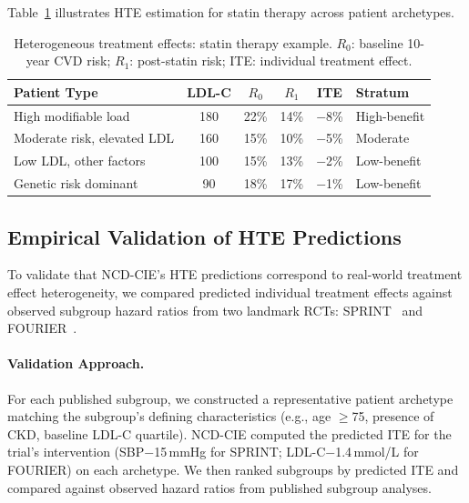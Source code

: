 \documentclass[runningheads]{llncs}
\begin{document}
Table~\ref{tab:hte} illustrates HTE estimation for statin therapy
across patient archetypes.

\renewcommand{\arraystretch}{1.1}
\begin{table}[t]
\centering
\caption{Heterogeneous treatment effects: statin therapy example.
$R_0$: baseline 10-year CVD risk; $R_1$: post-statin risk;
ITE: individual treatment effect.}\label{tab:hte}
\small
\begin{tabular}{@{}lccccl@{}}
\toprule
\textbf{Patient Type} & \textbf{LDL-C} & \textbf{$R_0$} & \textbf{$R_1$} &
\textbf{ITE} & \textbf{Stratum} \\
\midrule
High modifiable load & 180 & 22\% & 14\% & $-$8\% & High-benefit \\
Moderate risk, elevated LDL & 160 & 15\% & 10\% & $-$5\% & Moderate \\
Low LDL, other factors & 100 & 15\% & 13\% & $-$2\% & Low-benefit \\
Genetic risk dominant & 90 & 18\% & 17\% & $-$1\% & Low-benefit \\
\bottomrule
\end{tabular}
\end{table}
\renewcommand{\arraystretch}{1.0}

\subsection{Empirical Validation of HTE Predictions}\label{sec:htevalid}

To validate that NCD-CIE's HTE predictions correspond to real-world
treatment effect heterogeneity, we compared predicted individual
treatment effects against observed subgroup hazard ratios from two
landmark RCTs: SPRINT~\cite{sprint2015,rostomian2020sprint} and
FOURIER~\cite{sabatine2017fourier,pokrywka2019fourier}.

\paragraph{Validation Approach.}
For each published subgroup, we constructed a representative patient
archetype matching the subgroup's defining characteristics (e.g.,
age $\geq$75, presence of CKD, baseline LDL-C quartile).
NCD-CIE computed the predicted ITE for the trial's intervention
(SBP$-$15\,mmHg for SPRINT; LDL-C$-$1.4\,mmol/L for FOURIER) on
each archetype.
We then ranked subgroups by predicted ITE and compared against
observed hazard ratios from published subgroup analyses.
\end{document}
